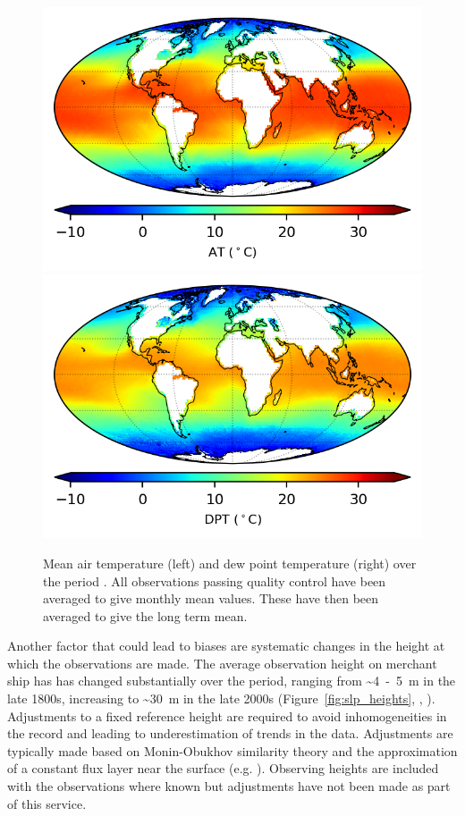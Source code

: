 \begin{figure}[h]
    \centering
    \includegraphics{resources/observations-at-mean-map-optimal.png}
    \includegraphics{resources/observations-dpt-mean-map-optimal.png}
    \caption{Mean air temperature (left) and dew point temperature (right) over the period \datatimerange{}. All observations passing quality control have been averaged to give monthly mean values. These have then been averaged to give the long term mean.\\}
    \label{fig:at-map}
\end{figure}
\FloatBarrier
Another factor that could lead to biases are systematic changes in the height at which the observations are made. The average observation height on merchant ship has has changed substantially over the period, ranging from \sim 4~-~5~m in the late 1800s, increasing to \sim 30~m in the late 2000s (Figure~\ref{fig:slp_heights}, \cite{Kent2007}, \cite{ Kent2013NMAT}). 
Adjustments to a fixed reference height are required to avoid inhomogeneities in the record and leading to underestimation of trends in the data. 
Adjustments are typically made based on Monin-Obukhov similarity theory and the approximation of a constant flux layer near the surface (e.g. \cite{Businger1971}). 
Observing heights are included with the observations where known but adjustments have not been made as part of this service.

